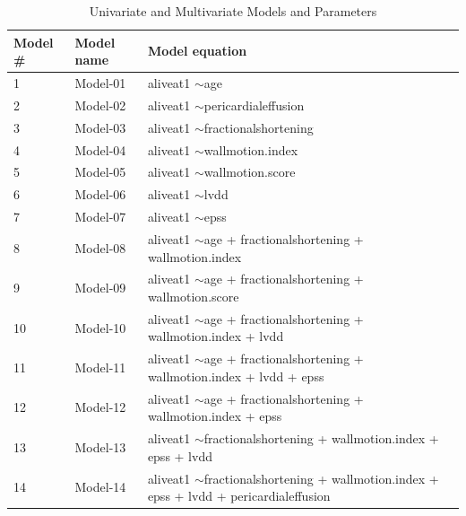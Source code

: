 \documentclass[11pt]{article}
\begin{document}
\begin{table}[htbp]
\centering
\begin{tabular}{@{}lll@{}}
\toprule
\textbf{Model \#} & \textbf{Model name} & \textbf{Model equation}                                                                    \\ \midrule
1                 & Model-01            & aliveat1 $\sim$age                                                                         \\
2                 & Model-02            & aliveat1 $\sim$pericardialeffusion                                                         \\
3                 & Model-03            & aliveat1 $\sim$fractionalshortening                                                        \\
4                 & Model-04            & aliveat1 $\sim$wallmotion.index                                                            \\
5                 & Model-05            & aliveat1 $\sim$wallmotion.score                                                            \\
6                 & Model-06            & aliveat1 $\sim$lvdd                                                                        \\
7                 & Model-07            & aliveat1 $\sim$epss                                                                        \\
8                 & Model-08            & aliveat1 $\sim$age + fractionalshortening + wallmotion.index                               \\
9                 & Model-09            & aliveat1 $\sim$age + fractionalshortening + wallmotion.score                               \\
10                & Model-10            & aliveat1 $\sim$age + fractionalshortening + wallmotion.index + lvdd                        \\
11                & Model-11            & aliveat1 $\sim$age + fractionalshortening + wallmotion.index + lvdd + epss                 \\
12                & Model-12            & aliveat1 $\sim$age + fractionalshortening + wallmotion.index + epss                        \\
13                & Model-13            & aliveat1 $\sim$fractionalshortening + wallmotion.index + epss + lvdd                       \\
14                & Model-14            & aliveat1 $\sim$fractionalshortening + wallmotion.index + epss + lvdd + pericardialeffusion \\ \bottomrule
\end{tabular}
\caption{Univariate and Multivariate Models and Parameters}
\label{table:ModelParams}
\end{table}
\end{document}
